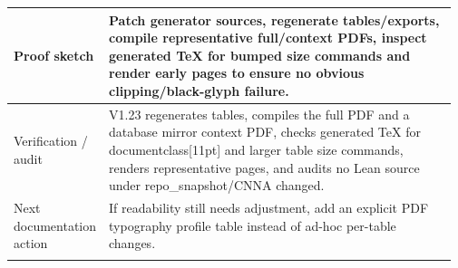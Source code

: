 \begin{longtable}{L{0.16\linewidth} L{0.81\linewidth}}
\hline\addlinespace[0.20em]
Proof sketch & Patch generator sources, regenerate tables/\allowbreak{}exports, compile representative full/\allowbreak{}context PDFs, inspect generated TeX for bumped size commands and render early pages to ensure no obvious clipping/\allowbreak{}black-glyph failure.\\
\hline\addlinespace[0.20em]
Verification /\allowbreak{} audit & V1.23 regenerates tables, compiles the full PDF and a database mirror context PDF, checks generated TeX for documentclass[11pt] and larger table size commands, renders representative pages, and audits no Lean source under repo\_snapshot/\allowbreak{}CNNA changed.\\
\hline\addlinespace[0.20em]
Next documentation action & If readability still needs adjustment, add an explicit PDF typography profile table instead of ad-hoc per-table changes.\\
\hline\addlinespace[0.20em]
\end{longtable}
